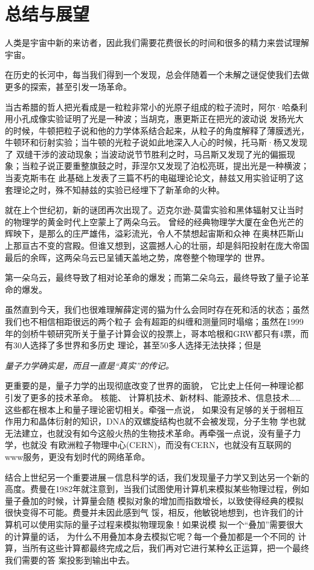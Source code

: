 ﻿
\chapter{总结与展望}

人类是宇宙中新的来访者，因此我们需要花费很长的时间和很多的精力来尝试理解宇宙。

在历史的长河中，每当我们得到一个发现，总会伴随着一个未解之谜促使我们去做更多的探索，甚至引发一场革命。

当古希腊的哲人把光看成是一粒粒非常小的光原子组成的粒子流时，阿尔·哈桑利用小孔成像实验证明了光是一种波；当胡克，惠更斯正在把光的波动说
发扬光大的时候，牛顿把粒子说和他的力学体系结合起来，从粒子的角度解释了薄膜透光，牛顿环和衍射实验；当牛顿的光粒子说如此地深入人心的时候，托马斯·杨又发现了
双缝干涉的波动现象；当波动说节节胜利之时，马吕斯又发现了光的偏振现象；当粒子说正要重整旗鼓之时，菲涅尔又发现了泊松亮斑，提出光是一种横波；当麦克斯韦在
此基础上发表了三篇不朽的电磁理论论文，赫兹又用实验证明了这套理论之时，殊不知赫兹的实验已经埋下了新革命的火种。

就在上个世纪初，新的谜团再次出现了。迈克尔逊-莫雷实验和黑体辐射又让当时的物理学的黄金时代上空蒙上了两朵乌云。
曾经的经典物理学大厦在金色光芒的辉映下，是那么的庄严雄伟，溢彩流光，令人不禁想起宙斯和众神
在奥林匹斯山上那亘古不变的宫殿。但谁又想到，这震撼人心的壮丽，却是斜阳投射在庞大帝国最后的余晖，这两朵乌云已呈铺天盖地之势，席卷整个物理学的
世界。

第一朵乌云，最终导致了相对论革命的爆发；而第二朵乌云，最终导致了量子论革命的爆发。

虽然直到今天，我们也很难理解薛定谔的猫为什么会同时存在死和活的状态；虽然我们也不相信相距很远的两个粒子
会有超距的纠缠和测量同时塌缩；虽然在1999年的剑桥牛顿研究所关于量子计算会议的投票上，哥本哈根和GRW都只有4票，而有30人选择了多世界和多历史
理论，甚至50多人选择无法抉择；但是

\emph{量子力学确实是，而且一直是“真实”的传记。}

更重要的是，量子力学的出现彻底改变了世界的面貌， 它比史上任何一种理论都引发了更多的技术革命。 核能、
计算机技术、新材料、能源技术、信息技术……这些都在根本上和量子理论密切相关。牵强一点说，
如果没有足够的关于弱相互作用力和晶体衍射的知识，DNA的双螺旋结构也就不会被发现，分子生物
学也就无法建立，也就没有如今这般火热的生物技术革命。再牵强一点说，没有量子力学，也就没
有欧洲粒子物理中心(CERN)，而没有CERN，也就没有互联网的www服务，更没有划时代的网络革命。

结合上世纪另一个重要进展－信息科学的话，我们发现量子力学又到达另一个新的高度。费曼在1982年就注意到，当我们试图使用计算机来模拟某些物理过程，例如量子叠加的时候，计算量会随
模拟对象的增加而指数增长，以致使得经典的模拟很快变得不可能。费曼并未因此感到气
馁，相反，他敏锐地想到，也许我们的计算机可以使用实际的量子过程来模拟物理现象！如果说模
拟一个“叠加”需要很大的计算量的话， 为什么不用叠加本身去模拟它呢？每一个叠加都是一个不同的
计算，当所有这些计算都最终完成之后，我们再对它进行某种幺正运算，把一个最终我们需要的答
案投影到输出中去。

